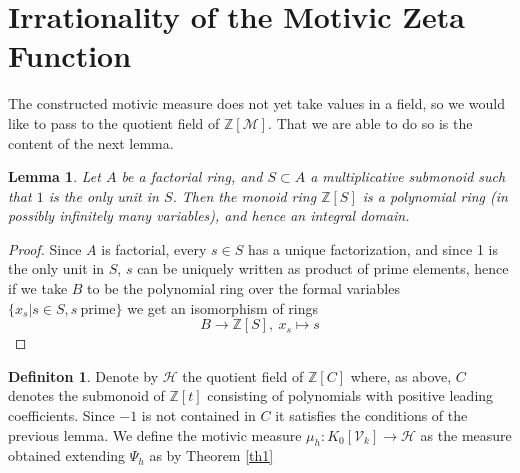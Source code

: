 \documentclass[11pt, a4paper, german]{article}
\theoremstyle{plain}
\newtheorem{lemma}[theorem]{Lemma}
\theoremstyle{definition}
\newtheorem{definition}[theorem]{Definiton}
\newcommand{\gring}[1][k]{K_0[\mathcal{V}_#1]}
\begin{document}

\section{Irrationality of the Motivic Zeta Function}
\label{final}
The constructed motivic measure does not yet take values in a field, so we would like to pass to the quotient field of $\mathbb{Z}[\mathcal{M}]$.
That we are able to do so is the content of the next lemma.

\begin{lemma}
    Let $A$ be a factorial ring, and $S \subset A$ a multiplicative submonoid such that $1$ is the only unit in $S$. Then the monoid ring
    $\mathbb{Z}[S]$ is a polynomial ring (in possibly infinitely many variables), and hence an integral domain.
\end{lemma}
\begin{proof}
    Since $A$ is factorial, every $s \in S$ has a unique factorization, and since 1 is the only unit in $S$, 
    $s$ can be uniquely written as product of prime elements, hence if we take $B$ to be the polynomial ring over the formal
    variables $\{x_s | s \in S, s\ \text{prime}\}$ we get an isomorphism of rings
    \[
        B \to \mathbb{Z}[S], \ x_s \mapsto s
    \]
\end{proof}

\begin{definition}
    Denote by $\mathcal{H}$ the quotient field of $\mathbb{Z}[C]$ where, as above, $C$ denotes the submonoid of $\mathbb{Z}[t]$ 
    consisting of polynomials with positive leading coefficients. Since $-1$ is not contained in $C$ it satisfies the conditions of the
    previous lemma.
    We define the motivic measure $\mu_h \colon \gring \to \mathcal{H}$ as the measure obtained extending $\Psi_h$ as by Theorem \ref{th1}
\end{definition}
\end{document}
